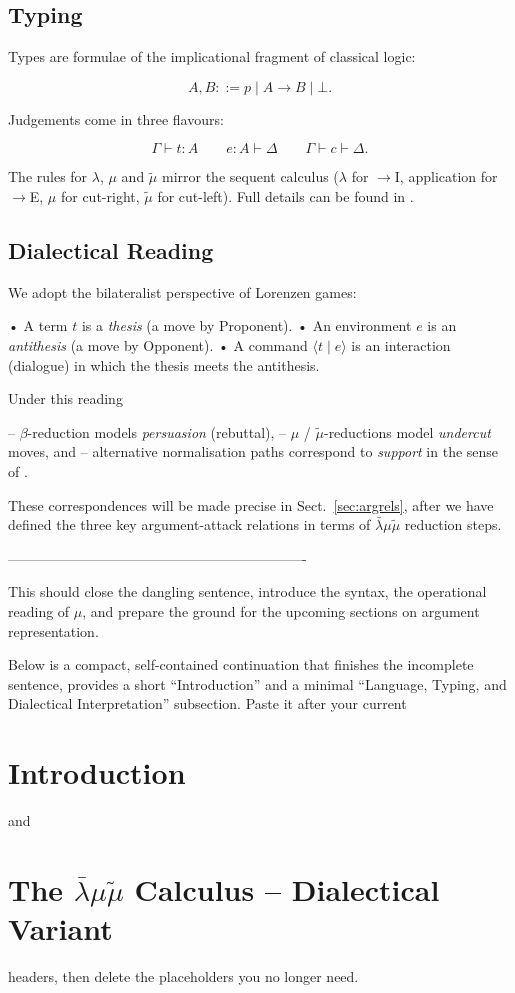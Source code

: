 \documentclass{ecai}
\newcommand{\matilda}{\bar{\lambda}\mu \tilde{\mu}}
\begin{document}
\begin{gpt}
\subsection{Typing}

Types are formulae of the implicational fragment of classical logic:

\[
  A,B ::= p \mid A \to B \mid \bot .
\]

Judgements come in three flavours:

\[ 
  \Gamma \vdash t : A \qquad
  e : A \vdash \Delta \qquad
  \Gamma \vdash c \vdash \Delta .
\]

The rules for $\lambda$, $\mu$ and $\tilde\mu$ mirror the sequent calculus ($\lambda$ for $\to$I, application for $\to$E, $\mu$ for \textsf{cut}-right, $\tilde\mu$ for \textsf{cut}-left).  Full details can be found in \cite{curien2011sym}.

\subsection{Dialectical Reading}

We adopt the bilateralist perspective of Lorenzen games:

• A term $t$ is a \emph{thesis} (a move by Proponent).  
• An environment $e$ is an \emph{antithesis} (a move by Opponent).  
• A command $\langle t \mid e\rangle$ is an interaction (dialogue) in which the thesis meets the antithesis.

Under this reading

– $\beta$-reduction models \emph{persuasion} (rebuttal),  
– $\mu$ / $\tilde\mu$-reductions model \emph{undercut} moves, and  
– alternative normalisation paths correspond to \emph{support} in the sense of \cite{autexier2006altern}.

These correspondences will be made precise in Sect.~\ref{sec:argrels}, after we have defined the three key argument-attack relations in terms of $\matilda$ reduction steps.

----------------------------------------------------------------

This should close the dangling sentence, introduce the syntax, the operational reading of $\mu$, and prepare the ground for the upcoming sections on argument representation.

Below is a compact, self-contained continuation that finishes the incomplete sentence, provides a short “Introduction” and a minimal “Language, Typing, and Dialectical Interpretation” subsection.  Paste it after your current \section{Introduction} and \section{The $\matilda$ Calculus – Dialectical Variant} headers, then delete the placeholders you no longer need.


\end{gpt}
\end{document}

